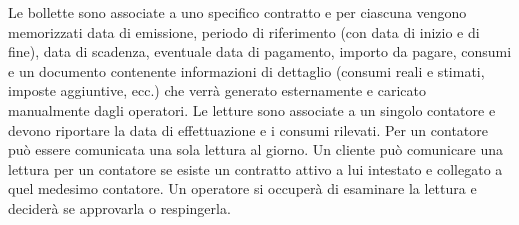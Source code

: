 \documentclass[a4paper,12pt]{report}
\begin{document}
\begin{mdframed}
\newline
Le bollette sono associate a uno specifico contratto e per ciascuna vengono memorizzati data di emissione, periodo di riferimento (con data di inizio e di fine), data di scadenza, eventuale data di pagamento, importo da pagare, consumi e un documento contenente informazioni di dettaglio (consumi reali e stimati, imposte aggiuntive, ecc.) che verrà generato esternamente e caricato manualmente dagli operatori.
\newline
Le letture sono associate a un singolo contatore e devono riportare la data di effettuazione e i consumi rilevati. Per un contatore può essere comunicata una sola lettura al giorno. Un cliente può comunicare una lettura per un contatore se esiste un contratto attivo a lui intestato e collegato a quel medesimo contatore. Un operatore si occuperà di esaminare la lettura e deciderà se approvarla o respingerla.
\end{mdframed}
\end{document}
